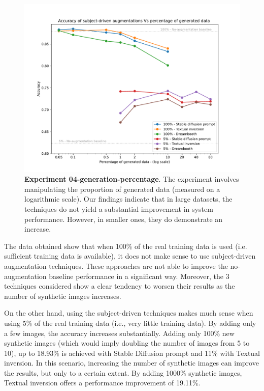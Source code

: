 \begin{figure}[th]
    \centering
    \includegraphics[width=1\textwidth]{Pictures/experiment_004.pdf}
    \caption{\textbf{Experiment 04-generation-percentage}. The experiment involves manipulating the proportion of generated data (measured on a logarithmic scale). Our findings indicate that in large datasets, the techniques do not yield a substantial improvement in system performance. However, in smaller ones, they do demonstrate an increase.}
    \label{fig:exp4}
\end{figure}

The data obtained show that when 100\% of the real training data is used (i.e. sufficient training data is available), it does not make sense to use subject-driven augmentation techniques. These approaches are not able to improve the no-augmentation baseline performance in a significant way. Moreover, the 3 techniques considered show a clear tendency to worsen their results as the number of synthetic images increases. 

On the other hand, using the subject-driven techniques makes much sense when using 5\% of the real training data (i.e., very little training data). By adding only a few images, the accuracy increases substantially. Adding only 100\% new synthetic images (which would imply doubling the number of images from 5 to 10), up to 18.93\% is achieved with Stable Diffusion prompt and 11\% with Textual inversion. In this scenario, increasing the number of synthetic images can improve the results, but only to a certain extent. By adding 1000\% synthetic images, Textual inversion offers a performance improvement of 19.11\%.

